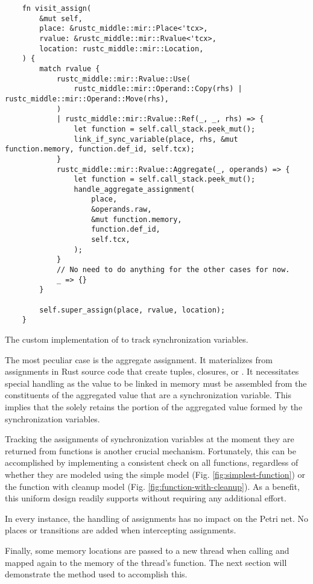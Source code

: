 \begin{listing}[!htb]
  \begin{verbatim}
    fn visit_assign(
        &mut self,
        place: &rustc_middle::mir::Place<'tcx>,
        rvalue: &rustc_middle::mir::Rvalue<'tcx>,
        location: rustc_middle::mir::Location,
    ) {
        match rvalue {
            rustc_middle::mir::Rvalue::Use(
                rustc_middle::mir::Operand::Copy(rhs) | rustc_middle::mir::Operand::Move(rhs),
            )
            | rustc_middle::mir::Rvalue::Ref(_, _, rhs) => {
                let function = self.call_stack.peek_mut();
                link_if_sync_variable(place, rhs, &mut function.memory, function.def_id, self.tcx);
            }
            rustc_middle::mir::Rvalue::Aggregate(_, operands) => {
                let function = self.call_stack.peek_mut();
                handle_aggregate_assignment(
                    place,
                    &operands.raw,
                    &mut function.memory,
                    function.def_id,
                    self.tcx,
                );
            }
            // No need to do anything for the other cases for now.
            _ => {}
        }

        self.super_assign(place, rvalue, location);
    }
  \end{verbatim}
  \caption{The custom implementation of  to track synchronization variables.}
  \label{lst:visit-assign}
\end{listing}

The most peculiar case is the aggregate assignment.
It materializes from assignments in Rust source code
that create tuples, closures, or .
It necessitates special handling as the value to be linked in memory must be assembled
from the constituents of the aggregated value that are a synchronization variable.
This implies that the  solely retains the portion of the aggregated value
formed by the synchronization variables.

Tracking the assignments of synchronization variables
at the moment they are returned from functions is another crucial mechanism.
Fortunately, this can be accomplished by implementing a consistent check on all functions,
regardless of whether they are modeled using
the simple model (Fig. \ref{fig:simplest-function})
or the function with cleanup model (Fig. \ref{fig:function-with-cleanup}).
As a benefit, this uniform design readily supports 
without requiring any additional effort.

In every instance, the handling of assignments has no impact on the Petri net.
No places or transitions are added when intercepting assignments.

Finally, some memory locations are passed to a new thread when
calling 
and mapped again to the memory of the thread's function.
The next section will demonstrate the method used to accomplish this.